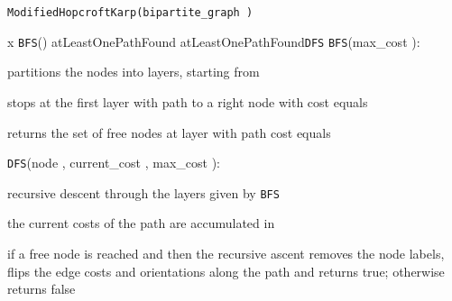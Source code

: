 \let\accentvec\vec \documentclass{llncs}
\begin{document}
\begin{algorithm}[!ht] 
\small
\caption{\texttt{ModifiedHopcroftKarp(\textsf{bipartite\_graph} )}\label{algo:modHK}}



\;
{
 x\;
 \texttt{BFS}()\;
\textrm{atLeastOnePathFound} \KwFalse\;
    \ForEach{}
    {
        \textrm{atLeastOnePathFound}\texttt{DFS}\;
    }
    {
        \;
    }
}
\texttt{BFS}(\textsf{max\_cost} ):
\begin{compactitem}
 \item partitions the nodes into layers, starting from 
 \item stops at the first layer  with path to a right node with cost equals 
 \item returns the set of free nodes at layer  with path cost equals 
\end{compactitem}
 
\texttt{DFS}(\textsf{node} , \textsf{current\_cost} , \textsf{max\_cost} ):
\begin{compactitem}
 \item recursive descent through the layers given by \texttt{BFS}
 \item the current costs of the path are accumulated in 
 \item if a free node  is reached and  then the recursive ascent removes the node labels, flips the edge costs and orientations along the path and returns true; otherwise returns false
\end{compactitem}

\end{algorithm}
\end{document}
